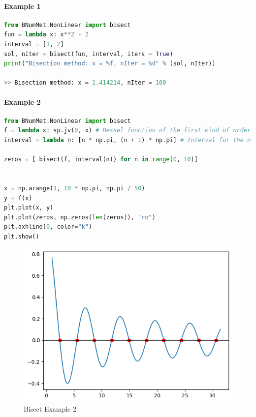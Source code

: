 \paragraph{Example 1}{
\begin{lstlisting}[language=Python]
from BNumMet.NonLinear import bisect
fun = lambda x: x**2 - 2
interval = [1, 2]
sol, nIter = bisect(fun, interval, iters = True)
print("Bisection method: x = %f, nIter = %d" % (sol, nIter))

>> Bisection method: x = 1.414214, nIter = 100
\end{lstlisting}
}
\paragraph{Example 2}{
\begin{lstlisting}[language=Python]
from BNumMet.NonLinear import bisect
f = lambda x: sp.jv(0, x) # Bessel function of the first kind of order 0
interval = lambda n: [n * np.pi, (n + 1) * np.pi] # Interval for the n-th zero

zeros = [ bisect(f, interval(n)) for n in range(0, 10)]


x = np.arange(1, 10 * np.pi, np.pi / 50)
y = f(x)
plt.plot(x, y)
plt.plot(zeros, np.zeros(len(zeros)), "ro")
plt.axhline(0, color="k")
plt.show()
\end{lstlisting}
\begin{figure}[H]
    \centering
    \includegraphics{Include/Images/Thesis/Documentation/NonLinear/Bisect Example 2.png}
    \caption{Bisect Example 2}
    \label{fig:Bisect Example 2}
\end{figure}
}